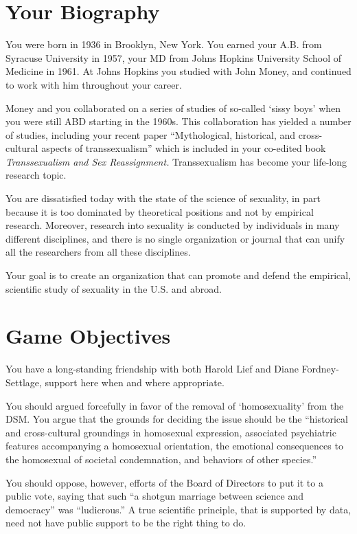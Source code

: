 \begin{refsection}
\section{Your Biography}
\label{yourbiography}

You were born in 1936 in Brooklyn, New York. You earned your A.B. from Syracuse University in 1957, your MD from Johns Hopkins University School of Medicine in 1961. At Johns Hopkins you studied with John Money, and continued to work with him throughout your career.

Money and you collaborated on a series of studies of so-called `sissy boys' when you were still ABD starting in the 1960s. This collaboration has yielded a number of studies, including your recent paper “Mythological, historical, and cross-cultural aspects of transsexualism” which is included in your co-edited book \emph{Transsexualism and Sex Reassignment.} Transsexualism has become your life-long research topic.

You are dissatisfied today with the state of the science of sexuality, in part because it is too dominated by theoretical positions and not by empirical research. Moreover, research into sexuality is conducted by individuals in many different disciplines, and there is no single organization or journal that can unify all the researchers from all these disciplines.

Your goal is to create an organization that can promote and defend the empirical, scientific study of sexuality in the U.S. and abroad.

\section{Game Objectives}
\label{gameobjectives}

You have a long-standing friendship with both Harold Lief and Diane Fordney-Settlage, support here when and where appropriate.

You should argued forcefully in favor of the removal of `homosexuality' from the DSM. You argue that the grounds for deciding the issue should be the ``historical and cross-cultural groundings in homosexual expression, associated psychiatric features accompanying a homosexual orientation, the emotional consequences to the homosexual of societal condemnation, and behaviors of other species.''

You should oppose, however, efforts of the Board of Directors to put it to a public vote, saying that such ``a shotgun marriage between science and democracy'' was ``ludicrous.'' A true scientific principle, that is supported by data, need not have public support to be the right thing to do.


\end{refsection}
